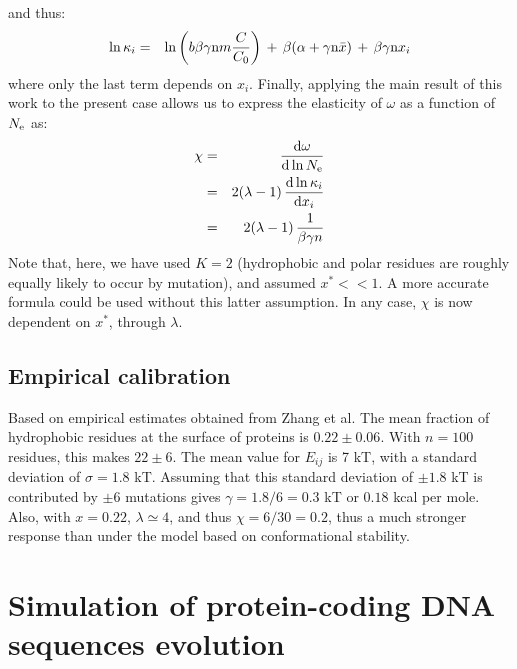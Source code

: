 \documentclass{article}
\begin{document}
and thus:
\begin{eqnarray}
\ln \kappa_i &=& \ln \left( b \beta \gamma \text{n} m \frac{C}{C_0}  \right) \, + \, \beta (\alpha +\gamma \text{n} \bar x) \, + \, \beta \gamma\text{n} x_i
\end{eqnarray}
where only the last term depends on $x_i$.
Finally, applying the main result of this work to the present case allows us to express the elasticity of $\omega$ as a function of $N_{\mathrm{e}}$ as:
\begin{eqnarray}
\chi &=& \frac{\mathrm{d}\omega} {\mathrm{d} \ln N_{\mathrm{e}}} 
\\ &=&  2(\lambda - 1) \, \frac{\mathrm{d}\ln \kappa_i}{\mathrm{d} x_i} 
\\ &=&  2 (\lambda - 1) \, \frac{1}{\beta \gamma n}
\end{eqnarray}
Note that, here, we have used $K=2$ (hydrophobic and polar residues are roughly equally likely to occur by mutation), and assumed $x^* << 1$. A more accurate formula could be used without this latter assumption. In any case, $\chi$ is now dependent on $x^*$, through $\lambda$.
\subsection{Empirical calibration}
Based on empirical estimates obtained from Zhang et al. The mean fraction of hydrophobic residues at the surface of proteins is $0.22 \pm 0.06$. With $n=100$ residues, this makes $22 \pm 6$. The mean value for $E_{ij}$ is 7 kT, with a standard deviation of $\sigma = 1.8$ kT. Assuming that this standard deviation of $\pm 1.8$ kT is contributed by $\pm 6$ mutations gives $\gamma = 1.8 / 6 = 0.3$ kT or $0.18$ kcal per mole. Also, with $x=0.22$, $\lambda \simeq 4$, and thus $\chi = 6  / 30 = 0.2$, thus a much stronger response than under the model based on conformational stability.

\section{Simulation of protein-coding DNA sequences evolution}
\end{document}
